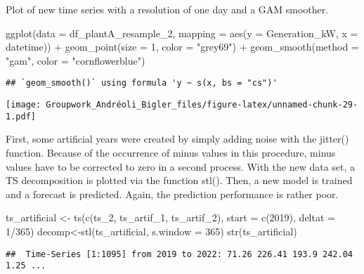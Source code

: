 \documentclass[
]{article}
\newenvironment{Shaded}{\begin{snugshade}}{\end{snugshade}}
\newcommand{\AttributeTok}[1]{\textcolor[rgb]{0.77,0.63,0.00}{#1}}
\newcommand{\DecValTok}[1]{\textcolor[rgb]{0.00,0.00,0.81}{#1}}
\newcommand{\FunctionTok}[1]{\textcolor[rgb]{0.00,0.00,0.00}{#1}}
\newcommand{\NormalTok}[1]{#1}
\newcommand{\OtherTok}[1]{\textcolor[rgb]{0.56,0.35,0.01}{#1}}
\newcommand{\SpecialCharTok}[1]{\textcolor[rgb]{0.00,0.00,0.00}{#1}}
\newcommand{\StringTok}[1]{\textcolor[rgb]{0.31,0.60,0.02}{#1}}
\begin{document}
Plot of new time series with a resolution of one day and a GAM smoother.

\begin{Shaded}
\begin{Highlighting}[]
\FunctionTok{ggplot}\NormalTok{(}\AttributeTok{data =}\NormalTok{ df\_plantA\_resample\_2,}
  \AttributeTok{mapping =} \FunctionTok{aes}\NormalTok{(}\AttributeTok{y =}\NormalTok{ Generation\_kW, }\AttributeTok{x =}\NormalTok{ datetime)) }\SpecialCharTok{+}
  \FunctionTok{geom\_point}\NormalTok{(}\AttributeTok{size =} \DecValTok{1}\NormalTok{, }\AttributeTok{color =} \StringTok{"grey69"}\NormalTok{) }\SpecialCharTok{+}
  \FunctionTok{geom\_smooth}\NormalTok{(}\AttributeTok{method =} \StringTok{"gam"}\NormalTok{, }\AttributeTok{color =} \StringTok{"cornflowerblue"}\NormalTok{)}
\end{Highlighting}
\end{Shaded}

\begin{verbatim}
## `geom_smooth()` using formula 'y ~ s(x, bs = "cs")'
\end{verbatim}

\texttt{[image: Groupwork\_Andréoli\_Bigler\_files/figure-latex/unnamed-chunk-29-1.pdf]}

First, some artificial years were created by simply adding noise with
the jitter() function. Because of the occurrence of minus values in this
procedure, minus values have to be corrected to zero in a second
process. With the new data set, a TS decomposition is plotted via the
function stl(). Then, a new model is trained and a forecast is
predicted. Again, the prediction performance is rather poor.

\begin{Shaded}
\begin{Highlighting}[]
\NormalTok{ts\_artificial }\OtherTok{\textless{}{-}} \FunctionTok{ts}\NormalTok{(}\FunctionTok{c}\NormalTok{(ts\_2, ts\_artif\_1, ts\_artif\_2), }\AttributeTok{start =} \FunctionTok{c}\NormalTok{(}\DecValTok{2019}\NormalTok{), }\AttributeTok{deltat =} \DecValTok{1}\SpecialCharTok{/}\DecValTok{365}\NormalTok{)}
\NormalTok{decomp}\OtherTok{\textless{}{-}}\FunctionTok{stl}\NormalTok{(ts\_artificial, }\AttributeTok{s.window =} \DecValTok{365}\NormalTok{)}
\FunctionTok{str}\NormalTok{(ts\_artificial)}
\end{Highlighting}
\end{Shaded}

\begin{verbatim}
##  Time-Series [1:1095] from 2019 to 2022: 71.26 226.41 193.9 242.04 1.25 ...
\end{verbatim}
\end{document}
